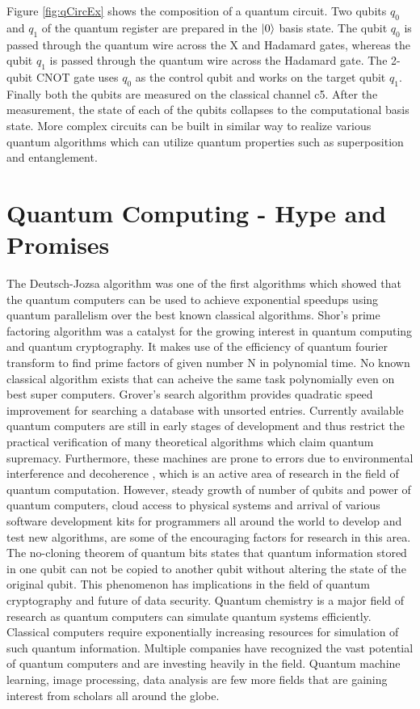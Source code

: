 \documentclass[english,a4paper,11pt,oneside,onecolumn]{book}
\begin{document}
Figure \ref{fig:qCircEx} shows the composition of a quantum circuit. Two qubits \(q_0\) and \(q_1\) of the quantum register are prepared in the \(\ket{0}\) basis state. The qubit \(q_0\) is passed through the quantum wire across the X and Hadamard gates, whereas the qubit \(q_1\) is passed through the quantum wire across the Hadamard gate. The 2-qubit CNOT gate uses \(q_0\) as the control qubit and works on the target qubit \(q_1\). Finally both the qubits are measured on the classical channel c5. After the measurement, the state of each of the qubits collapses to the computational basis state. More complex circuits can be built in similar way to realize various quantum algorithms which can utilize quantum properties such as superposition and entanglement.

\section{Quantum Computing - Hype and Promises}
\label{sec:qHype}
The Deutsch-Jozsa algorithm \cite{aradyamath_2019_quantum} was one of the first algorithms which showed that the quantum computers can be used to achieve exponential speedups using quantum parallelism over the best known classical algorithms. Shor's prime factoring algorithm \cite{shor_2019_algorithms} was a catalyst for the growing interest in quantum computing and quantum cryptography. It makes use of the efficiency of quantum fourier transform to find prime factors of given number N in polynomial time. No known classical algorithm exists that can acheive the same task polynomially even on best super computers. Grover's search algorithm \cite{grover_1996_a} provides quadratic speed improvement for searching a database with unsorted entries.
Currently available quantum computers are still in early stages of development and thus restrict the practical verification of many theoretical algorithms which claim quantum supremacy. Furthermore, these machines are prone to errors due to environmental interference and decoherence \cite{schuld_2020_circuitcentric}, which is an active area of research in the field of quantum computation. However, steady growth of number of qubits and power of quantum computers, cloud access to physical systems and arrival of various software development kits for programmers all around the world to develop and test new algorithms, are some of the encouraging factors for research in this area.
The no-cloning theorem \cite{wootters_1982_a} of quantum bits states that quantum information stored in one qubit can not be copied to another qubit without altering the state of the original qubit. This phenomenon has implications in the field of quantum cryptography and future of data security. Quantum chemistry is a major field of research as quantum computers can simulate quantum systems efficiently. Classical computers require exponentially increasing resources for simulation of such quantum information. Multiple companies have recognized the vast potential of quantum computers and are investing heavily in the field. Quantum machine learning, image processing, data analysis are few more fields that are gaining interest from scholars all around the globe.
\end{document}
